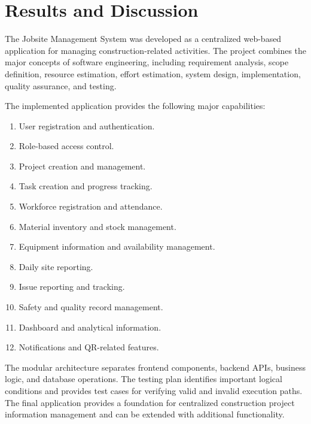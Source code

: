 \documentclass[11pt,a4paper]{article}
\begin{document}
\section{Results and Discussion}
The Jobsite Management System was developed as a centralized web-based application for managing construction-related activities. The project combines the major concepts of software engineering, including requirement analysis, scope definition, resource estimation, effort estimation, system design, implementation, quality assurance, and testing.

The implemented application provides the following major capabilities:
\begin{enumerate}[itemsep=1pt]
\item User registration and authentication.
\item Role-based access control.
\item Project creation and management.
\item Task creation and progress tracking.
\item Workforce registration and attendance.
\item Material inventory and stock management.
\item Equipment information and availability management.
\item Daily site reporting.
\item Issue reporting and tracking.
\item Safety and quality record management.
\item Dashboard and analytical information.
\item Notifications and QR-related features.
\end{enumerate}
The modular architecture separates frontend components, backend APIs, business logic, and database operations. The testing plan identifies important logical conditions and provides test cases for verifying valid and invalid execution paths. The final application provides a foundation for centralized construction project information management and can be extended with additional functionality.
\end{document}
